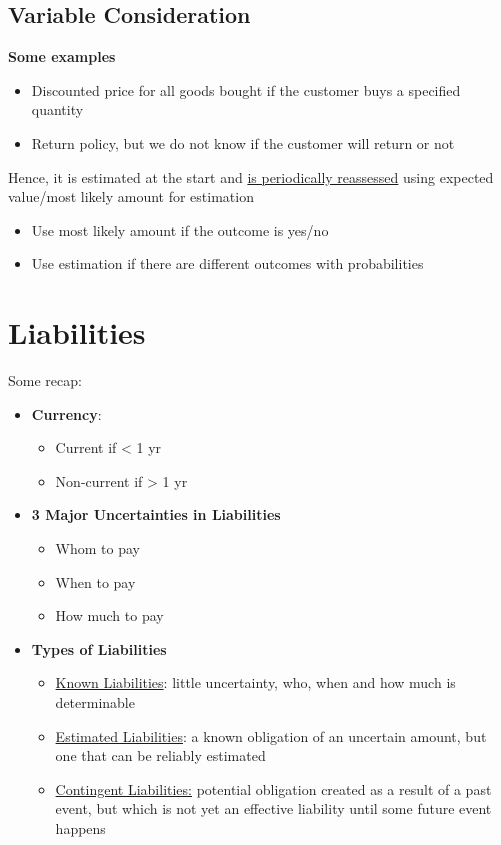 \documentclass{article}
\begin{document}
\begin{multicols}{2}
\subsection{Variable Consideration}
\textbf{Some examples}
\begin{itemize}
	\item Discounted price for all goods bought if the customer buys a specified quantity
	\item Return policy, but we do not know if the customer will return or not
\end{itemize}
Hence, it is estimated at the start and \underline{is periodically reassessed} using expected value/most likely amount for estimation
\begin{itemize}
	\item Use most likely amount if the outcome is yes/no
	\item Use estimation if there are different outcomes with probabilities
\end{itemize}
\section{Liabilities}
Some recap:
\begin{itemize}
	\item \textbf{Currency}:
	\begin{itemize}
		\item Current if < 1 yr
		\item Non-current if > 1 yr
	\end{itemize}
    \item \textbf{3 Major Uncertainties in Liabilities}
    \begin{itemize}
    	\item Whom to pay
    	\item When to pay
    	\item How much to pay
    \end{itemize}
    \item \textbf{Types of Liabilities}
    \begin{itemize}
    	\item \underline{Known Liabilities}: little uncertainty, who, when and how much is determinable
    	\item \underline{Estimated Liabilities}: a known obligation of an uncertain amount, but one that can be reliably estimated
    	\item \underline{Contingent Liabilities:} potential obligation created as a result of a past event, but which is not yet an effective liability until some future event happens
    \end{itemize}
\end{itemize}

\end{multicols}
\end{document}
